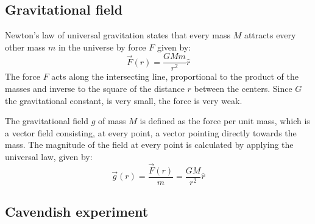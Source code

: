 \documentclass[\main/master.tex]{subfiles}
\begin{document}
\subsection{Gravitational field}
Newton's law of universal gravitation states that every mass $M$ attracts every other mass $m$ in the universe by force $F$ given by:
\begin{equation}
\overrightarrow{F}(r) = \frac{GMm}{r^2}\hat{r}    \label{eqn:gravitation_force}
\end{equation}
The force $F$ acts along the intersecting line, proportional to the product of the masses and inverse to the square of the distance $r$ between the centers. Since $G$ the gravitational constant, is very small, the force is very weak.
\par\noindent
The gravitational field $g$ of mass $M$ is defined as the force per unit mass, which is a vector field consisting, at every point, a vector pointing directly towards the mass. The magnitude of the field at every point is calculated by applying the universal law, given by: 
\begin{equation}
\overrightarrow{g}(r) = \frac{\overrightarrow{F}(r)}{m} = \frac{GM}{r^2}\hat{r}    \label{eqn:gravitation_field}
\end{equation}
\iffalse
\subsubsection{Field measurement}
\par\noindent
The field caused by a test mass $M$ at a specific point is calculated by measuring the gravitational force acting on a known mass $m$. In general, test mass $M$ is much larger than mass $m$, ensuring a negligible influence on the behavior of $M$.  
\fi
\subsection{Cavendish experiment}
\end{document}
